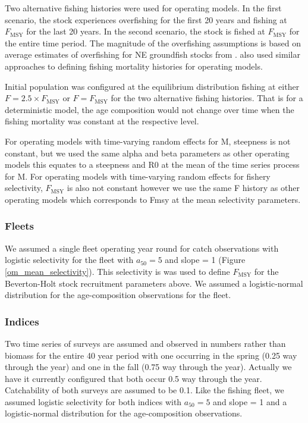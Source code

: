 \documentclass[
  12pt,
]{article}
\newcommand{\Fmsy}{\ensuremath{F_{\text{MSY}}}\xspace}
\begin{document}
Two alternative fishing histories were used for operating models. In the
first scenario, the stock experiences overfishing for the first 20 years
and fishing at \Fmsy for the last 20 years. In the second scenario, the
stock is fished at \Fmsy for the entire time period. The magnitude of
the overfishing assumptions is based on average estimates of overfishing
for NE groundfish stocks from \citet{wiedenmannetal19}.
 also used similar approaches to defining fishing
mortality histories for operating models.

Initial population was configured at the equilibrium distribution
fishing at either \(F = 2.5\times \Fmsy\) or \(F = \Fmsy\) for the two
alternative fishing histories. That is for a deterministic model, the
age composition would not change over time when the fishing mortality
was constant at the respective level.

For operating models with time-varying random effects for M, steepness
is not constant, but we used the same alpha and beta parameters as other
operating models this equates to a steepness and R0 at the mean of the
time series process for M. For operating models with time-varying random
effects for fishery selectivity, \Fmsy is also not constant however we
use the same F history as other operating models which corresponds to
Fmsy at the mean selectivity parameters.

\hypertarget{fleets}{%
\subsubsection*{Fleets}\label{fleets}}

We assumed a single fleet operating year round for catch observations
with logistic selectivity for the fleet with \(a_{50} = 5\) and slope =
1 (Figure \ref{om_mean_selectivity}). This selectivity is was used to
define \Fmsy for the Beverton-Holt stock recruitment parameters above.
We assumed a logistic-normal distribution for the age-composition
observations for the fleet.

\hypertarget{indices}{%
\subsubsection*{Indices}\label{indices}}

Two time series of surveys are assumed and observed in numbers rather
than biomass for the entire 40 year period with one occurring in the
spring (0.25 way through the year) and one in the fall (0.75 way through
the year). Actually we have it currently configured that both occur 0.5
way through the year. Catchability of both surveys are assumed to be
0.1. Like the fishing fleet, we assumed logistic selectivity for both
indices with \(a_{50} = 5\) and slope = 1 and a logistic-normal
distribution for the age-composition observations.
\end{document}

